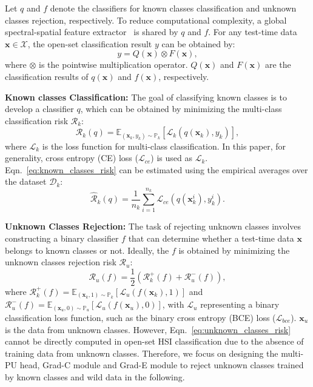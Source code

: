 Let $q$ and $f$ denote the classifiers for known classes classification and unknown classes rejection, respectively. To reduce computational complexity, a global spectral-spatial feature extractor~\cite{FPGA} is shared by $q$ and $f$. For any test-time data $\boldsymbol{x} \in \mathcal{X}$, the open-set classification result $y$ can be obtained by:
\begin{equation}
    y=Q(\boldsymbol{x}){\otimes}F(\boldsymbol{x}),
\end{equation}
where $\otimes$ is the pointwise multiplication operator. $Q(\boldsymbol{x})$ and $F(\boldsymbol{x})$ are the classification results of $q(\boldsymbol{x})$ and $f(\boldsymbol{x})$, respectively.

\noindent \textbf{Known classes Classification:}
The goal of classifying known classes is to develop a classifier $q$, which can be obtained by minimizing the multi-class classification risk $\mathcal{R}_{k}$:
\begin{equation}
    \mathcal{R}_{k}(q)=\mathbb{E}_{(\boldsymbol{x}_{k},y_{k}){\sim}\mathbb{P}_{k}}\left[\mathcal{L}_{k}(q(\boldsymbol{x}_{k}),y_{k})\right],
    \label{eq:known_classes_risk}
\end{equation}
where $\mathcal{L}_{k}$ is the loss function for multi-class classification. In this paper, for generality, cross entropy (CE) loss ($\mathcal{L}_{ce}$) is used as $\mathcal{L}_{k}$. Eqn.~\ref{eq:known_classes_risk} can be estimated using the empirical averages over the dataset $\mathcal{D}_{k}$:
\begin{equation}
    \hat{\mathcal{R}}_{k}(q)=\frac{1}{n_{k}}\sum_{i=1}^{n_{k}}\mathcal{L}_{ce}(q(\boldsymbol{x}_{k}^{i}),y_{k}^{i}).
    \label{eq:known_classes_average_loss}
\end{equation}

\noindent \textbf{Unknown Classes Rejection:}
The task of rejecting unknown classes involves constructing a binary classifier $f$ that can determine whether a test-time data $\boldsymbol{x}$ belongs to known classes or not. Ideally, the $f$ is obtained by minimizing the unknown classes rejection risk $\mathcal{R}_{u}$:
\begin{equation}
    \mathcal{R}_{u}(f)=\frac{1}{2}\left(\mathcal{R}^{+}_{k}(f)+\mathcal{R}^{-}_{u}(f)\right),
    \label{eq:unknown_classes_risk}
\end{equation}
where $\mathcal{R}^{+}_{k}(f)=\mathbb{E}_{(\boldsymbol{x}_{k},1){\sim}{\mathbb{P}_{k}}}\left[\mathcal{L}_{u}(f(\boldsymbol{x}_{k}),1)\right]$ and $\mathcal{R}^{-}_{u}(f)=\mathbb{E}_{(\boldsymbol{x}_{u},0){\sim}{\mathbb{P}_{u}}}\left[\mathcal{L}_{u}(f(\boldsymbol{x}_{u}),0)\right]$, with $\mathcal{L}_{u}$ representing a binary classification loss function, such as the binary cross entropy (BCE) loss ($\mathcal{L}_{bce}$). $\boldsymbol{x}_{u}$ is the data from unknown classes. However, Eqn.~\ref{eq:unknown_classes_risk} cannot be directly computed in open-set HSI classification due to the absence of training data from unknown classes. Therefore, we focus on designing the multi-PU head, Grad-C module and Grad-E module to reject unknown classes trained by known classes and wild data in the following.

